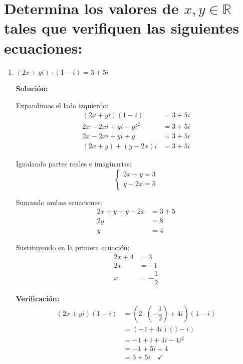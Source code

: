 \documentclass[12pt]{article}
\newcommand{\solucion}{%
    \vspace{0.8em}%
    \textbf{Solución:}%
}
\begin{document}
\section[Ecuaciones con números complejos]{Determina los valores de $x, y \in \mathbb{R}$ tales que verifiquen las siguientes ecuaciones:}

\begin{enumerate}[label=\alph*.-]
    \item $(2x + yi) \cdot (1 - i) = 3 + 5i$

    \solucion

    Expandimos el lado izquierdo:
    \begin{align*}
    (2x + yi)(1-i) &= 3 + 5i \\[0.3em]
    2x - 2xi + yi - yi^2 &= 3 + 5i \\[0.3em]
    2x - 2xi + yi + y &= 3 + 5i \\[0.3em]
    (2x + y) + (y - 2x)i &= 3 + 5i
    \end{align*}

    Igualando partes reales e imaginarias:
    \[
    \begin{cases}
    2x + y = 3 \\
    y - 2x = 5
    \end{cases}
    \]

    Sumando ambas ecuaciones:
    \begin{align*}
    2x + y + y - 2x &= 3 + 5 \\[0.3em]
    2y &= 8 \\[0.3em]
    y &= 4
    \end{align*}

    Sustituyendo en la primera ecuación:
    \begin{align*}
    2x + 4 &= 3 \\[0.3em]
    2x &= -1 \\[0.3em]
    x &= -\dfrac{1}{2}
    \end{align*}

    \textbf{Verificación:}
    \begin{align*}
    (2x + yi)(1-i) &= \left(2 \cdot \left(-\dfrac{1}{2}\right) + 4i\right)(1-i) \\[0.3em]
    &= (-1 + 4i)(1-i) \\[0.3em]
    &= -1 + i + 4i - 4i^2 \\[0.3em]
    &= -1 + 5i + 4 \\[0.3em]
    &= 3 + 5i \quad \checkmark
    \end{align*}


\end{enumerate}
\end{document}
